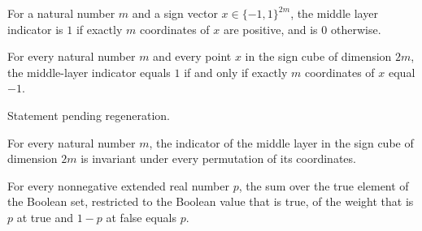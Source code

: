 \begin{definition}
\label{FABL.middleLayerIndicator}
\leanok
{}
For a natural number $m$ and a sign vector $x\in\{−1,1\}^{2m}$, the middle layer
indicator is $1$ if exactly $m$ coordinates of $x$ are positive, and is $0$ otherwise.
\end{definition}

\begin{theorem}
\label{FABL.middleLayerIndicator_eq_one_iff_negative_count}
\leanok
{}
For every natural number $m$ and every point $x$ in the sign cube of dimension $2m$, the
middle-layer indicator equals $1$ if and only if exactly $m$ coordinates of $x$ equal
$-1$.
\end{theorem}

\begin{theorem}
\label{FABL.discreteDerivative_majority_odd_last_eq_middleLayerIndicator}
\leanok
{}
Statement pending regeneration.
\end{theorem}

\begin{theorem}
\label{FABL.middleLayerIndicator_isSymmetric}
\leanok
{}
For every natural number $m$, the indicator of the middle layer in the sign cube of
dimension $2m$ is invariant under every permutation of its coordinates.
\end{theorem}

\begin{theorem}
\label{FABL.sum_bool_filter_true_middleLayer}
\leanok
{}
For every nonnegative extended real number $p$, the sum over the true element of the
Boolean set, restricted to the Boolean value that is true, of the weight that is $p$ at
true and $1-p$ at false equals $p$.
\end{theorem}

